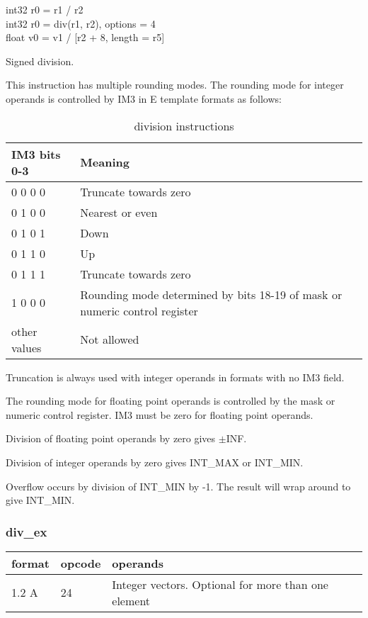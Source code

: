 \documentclass[forwardcom.tex]{subfiles}
\begin{document}
int32 r0 = r1 / r2 \\
int32 r0 = div(r1, r2), options = 4\\
float v0 = v1 / [r2 + 8, length = r5]
\vspace{2mm}

Signed division.

\vspace{2mm}
This instruction has multiple rounding modes. The rounding mode for integer operands is controlled by IM3 in E template formats as follows:

\begin{longtable} {|p{25mm}|p{80mm}|}
\caption{division instructions} 
\label{table:DivInstructions} \\
\endfirsthead
\endhead
\hline
\bfseries IM3 bits 0-3 & \bfseries Meaning   \\
\hline
 0 0 0 0 & Truncate towards zero \\
\hline
 0 1 0 0 & Nearest or even \\
 0 1 0 1 & Down \\
 0 1 1 0 & Up \\
 0 1 1 1 & Truncate towards zero \\
\hline
 1 0 0 0 & Rounding mode determined by bits 18-19 of mask or numeric control register \\
\hline
other values & Not allowed \\ 
\hline
\end{longtable}
Truncation is always used with integer operands in formats with no IM3 field.

\vspace{2mm}
The rounding mode for floating point operands is controlled by the mask or numeric control register. IM3 must be zero for floating point operands.

\vspace{2mm}
Division of floating point operands by zero gives $\pm$INF.

Division of integer operands by zero gives INT\_MAX or INT\_MIN.

Overflow occurs by division of INT\_MIN by -1. The result will wrap around to give INT\_MIN.

\subsubsection{div\_ex}
\label{table:divExInstruction}
\begin{tabular}{|p{12mm}|p{12mm}|p{110mm}|}
\hline
\bfseries format & \bfseries opcode & \bfseries operands \\ \hline
1.2 A & 24 & Integer vectors. Optional for more than one element \\ \hline
\end{tabular}
\vspace{2mm}
\end{document}
